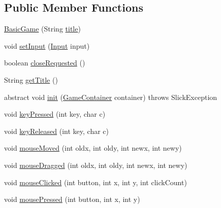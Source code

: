 \subsection*{Public Member Functions}
\begin{DoxyCompactItemize}
\item 
\mbox{\hyperlink{classorg_1_1newdawn_1_1slick_1_1_basic_game_a92a9b820871d0be8c00add4ed23dae9c}{Basic\+Game}} (String \mbox{\hyperlink{classorg_1_1newdawn_1_1slick_1_1_basic_game_a7d56224aca7f48d84cbd9f1d55cc5a70}{title}})
\item 
void \mbox{\hyperlink{classorg_1_1newdawn_1_1slick_1_1_basic_game_ac9847e7f185de833f745fd75b8b5730b}{set\+Input}} (\mbox{\hyperlink{classorg_1_1newdawn_1_1slick_1_1_input}{Input}} input)
\item 
boolean \mbox{\hyperlink{classorg_1_1newdawn_1_1slick_1_1_basic_game_a84830b3b65ccbc59e0050f5332bd4a3b}{close\+Requested}} ()
\item 
String \mbox{\hyperlink{classorg_1_1newdawn_1_1slick_1_1_basic_game_aa0f5bd5f0a628ed27a9d39d759ade637}{get\+Title}} ()
\item 
abstract void \mbox{\hyperlink{classorg_1_1newdawn_1_1slick_1_1_basic_game_a8af0900217e4d389249f71367b22d114}{init}} (\mbox{\hyperlink{classorg_1_1newdawn_1_1slick_1_1_game_container}{Game\+Container}} container)  throws Slick\+Exception
\item 
void \mbox{\hyperlink{classorg_1_1newdawn_1_1slick_1_1_basic_game_a4fbb3345b5abf5ddd54a99466d07f02f}{key\+Pressed}} (int key, char c)
\item 
void \mbox{\hyperlink{classorg_1_1newdawn_1_1slick_1_1_basic_game_ae8ce436f93206f0b251a0fbf2a345849}{key\+Released}} (int key, char c)
\item 
void \mbox{\hyperlink{classorg_1_1newdawn_1_1slick_1_1_basic_game_adaed74556aba405022579f9369f042eb}{mouse\+Moved}} (int oldx, int oldy, int newx, int newy)
\item 
void \mbox{\hyperlink{classorg_1_1newdawn_1_1slick_1_1_basic_game_a1df1a7ae6bfdace7dcf780fe76f920a3}{mouse\+Dragged}} (int oldx, int oldy, int newx, int newy)
\item 
void \mbox{\hyperlink{classorg_1_1newdawn_1_1slick_1_1_basic_game_a3103343304121288da2e40cc49466f94}{mouse\+Clicked}} (int button, int x, int y, int click\+Count)
\item 
void \mbox{\hyperlink{classorg_1_1newdawn_1_1slick_1_1_basic_game_af00b33ec970972ecabe458cbc6d66e8a}{mouse\+Pressed}} (int button, int x, int y)
\item 

\end{DoxyCompactItemize}
